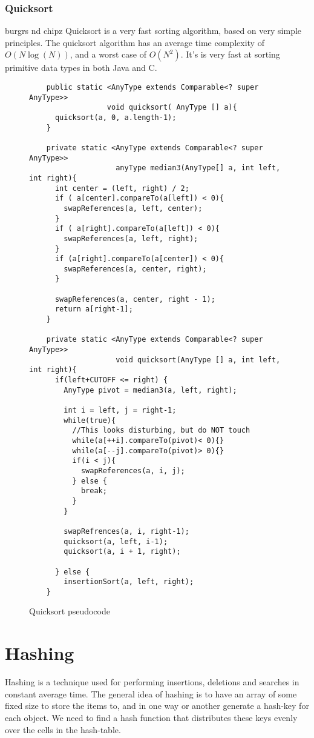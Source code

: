 \documentclass[paper=a4, fontsize=11pt]{scrartcl}
\numberwithin{equation}{section} %
\numberwithin{figure}{section} %
\numberwithin{table}{section} %
\theoremstyle{definition}
\begin{document}
\subsubsection{Quicksort}
burgrs nd chipz
Quicksort is a very fast sorting algorithm, based on very simple principles. The quicksort algorithm has an average time complexity of \(O(N\log(N))\), and a worst case of \(O(N^2)\). It's is very fast at sorting primitive data types in both Java and C.

\begin{figure}[p]
  \begin{verbatim}
    public static <AnyType extends Comparable<? super AnyType>> 
                  void quicksort( AnyType [] a){
      quicksort(a, 0, a.length-1);
    }
    
    private static <AnyType extends Comparable<? super AnyType>> 
                    anyType median3(AnyType[] a, int left, int right){
      int center = (left, right) / 2;
      if ( a[center].compareTo(a[left]) < 0){
        swapReferences(a, left, center);
      }
      if ( a[right].compareTo(a[left]) < 0){
        swapReferences(a, left, right);
      }
      if (a[right].compareTo(a[center]) < 0){
        swapReferences(a, center, right);
      }

      swapReferences(a, center, right - 1);
      return a[right-1];
    }

    private static <AnyType extends Comparable<? super AnyType>> 
                    void quicksort(AnyType [] a, int left, int right){
      if(left+CUTOFF <= right) {
        AnyType pivot = median3(a, left, right);
        
        int i = left, j = right-1;
        while(true){
          //This looks disturbing, but do NOT touch
          while(a[++i].compareTo(pivot)< 0){}
          while(a[--j].compareTo(pivot)> 0){}
          if(i < j){
            swapReferences(a, i, j);
          } else {
            break;
          }
        }
        
        swapRefrences(a, i, right-1);
        quicksort(a, left, i-1);
        quicksort(a, i + 1, right);
        
      } else {
        insertionSort(a, left, right);
    }
  \end{verbatim}
  \caption{Quicksort pseudocode}
\end{figure}

\section{Hashing}
Hashing is a technique used for performing insertions, deletions and searches in constant average time.
The general idea of hashing is to have an array of some fixed size to store the items to, and in one way or another generate
a hash-key for each object. We need to find a hash function that distributes these keys evenly over the cells in the hash-table.
\end{document}
